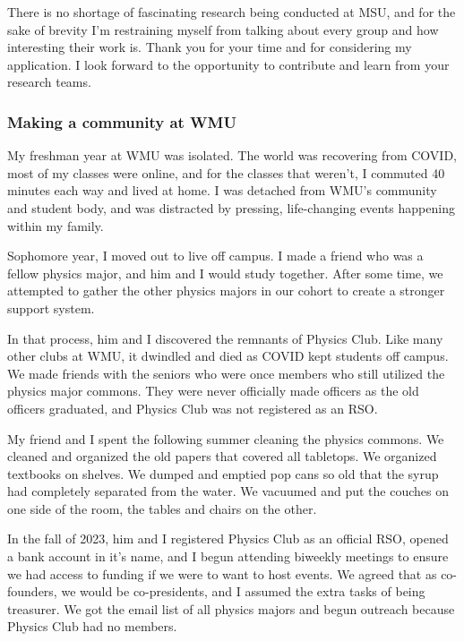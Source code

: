 \documentclass[11pt]{article}
\newcommand{\schoolabbr}{MSU}
\begin{document}
There is no shortage of fascinating research being conducted at \schoolabbr{}, and for the sake of brevity I'm restraining myself from talking about every group and how interesting their work is. Thank you for your time and for considering my application. I look forward to the opportunity to contribute and learn from your research teams.

\subsubsection*{Making a community at WMU}
My freshman year at WMU was isolated. The world was recovering from COVID, most of my classes were online, and for the classes that weren't, I commuted 40 minutes each way and lived at home. I was detached from WMU's community and student body, and was distracted by pressing, life-changing events happening within my family.

Sophomore year, I moved out to live off campus. I made a friend who was a fellow physics major, and him and I would study together. After some time, we attempted to gather the other physics majors in our cohort to create a stronger support system.

In that process, him and I discovered the remnants of Physics Club. Like many other clubs at WMU, it dwindled and died as COVID kept students off campus. We made friends with the seniors who were once members who still utilized the physics major commons. They were never officially made officers as the old officers graduated, and Physics Club was not registered as an RSO.

My friend and I spent the following summer cleaning the physics commons. We cleaned and organized the old papers that covered all tabletops. We organized textbooks on shelves. We dumped and emptied pop cans so old that the syrup had completely separated from the water. We vacuumed and put the couches on one side of the room, the tables and chairs on the other.

In the fall of 2023, him and I registered Physics Club as an official RSO, opened a bank account in it's name, and I begun attending biweekly meetings to ensure we had access to funding if we were to want to host events. We agreed that as co-founders, we would be co-presidents, and I assumed the extra tasks of being treasurer. We got the email list of all physics majors and begun outreach because Physics Club had no members.
\end{document}
